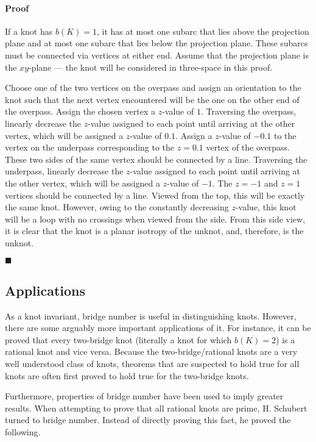 \documentclass[titlepage]{article}
\newcommand{\qed}{
    \begin{flushright}
        $\blacksquare$
    \end{flushright}
}
\begin{document}
\paragraph{Proof} If a knot has $b(K)=1$, it has at most one subarc that lies above the projection plane and at most one subarc that lies below the projection plane. These subarcs must be connected via vertices at either end. Assume that the projection plane is the $xy$-plane --- the knot will be considered in three-space in this proof.\par
Choose one of the two vertices on the overpass and assign an orientation to the knot such that the next vertex encountered will be the one on the other end of the overpass. Assign the chosen vertex a $z$-value of $1$. Traversing the overpass, linearly decrease the $z$-value assigned to each point until arriving at the other vertex, which will be assigned a $z$-value of $0.1$. Assign a $z$-value of $-0.1$ to the vertex on the underpass corresponding to the $z=0.1$ vertex of the overpass. These two sides of the same vertex should be connected by a line. Traversing the underpass, linearly decrease the $z$-value assigned to each point until arriving at the other vertex, which will be assigned a $z$-value of $-1$. The $z=-1$ and $z=1$ vertices should be connected by a line. Viewed from the top, this will be exactly the same knot. However, owing to the constantly decreasing $z$-value, this knot will be a loop with no crossings when viewed from the side. From this side view, it is clear that the knot is a planar isotropy of the unknot, and, therefore, is the unknot.
\qed


\subsection{Applications}\label{sss:applications}
As a knot invariant, bridge number is useful in distinguishing knots. However, there are some arguably more important applications of it. For instance, it can be proved that every two-bridge knot (literally a knot for which $b(K)=2$) is a rational knot and vice versa. Because the two-bridge/rational knots are a very well understood class of knots, theorems that are suspected to hold true for all knots are often first proved to hold true for the two-bridge knots.\par
Furthermore, properties of bridge number have been used to imply greater results. When attempting to prove that all rational knots are prime, H. Schubert turned to bridge number. Instead of directly proving this fact, he proved the following.
\end{document}
